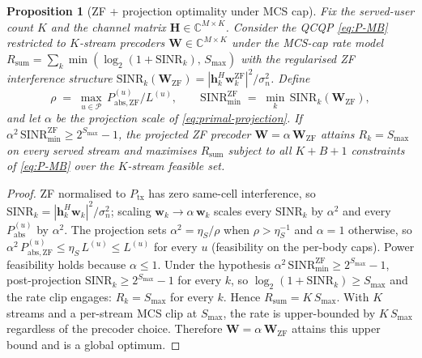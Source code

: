 \documentclass[journal,twocolumn,10pt]{IEEEtran}
\theoremstyle{plain}
\newtheorem{proposition}[theorem]{Proposition}
\theoremstyle{remark}
\newcommand{\hh}{\mathbf{h}}
\newcommand{\ww}{\mathbf{w}}
\newcommand{\Pabs}{P_{\mathrm{abs}}}
\newcommand{\HH}{\mathbf{H}}
\newcommand{\WW}{\mathbf{W}}
\newcommand{\PabsZF}{P_{\mathrm{abs},\mathrm{ZF}}}
\newcommand{\Complex}{\mathbb{C}}
\newcommand{\AllBodies}{\mathcal{P}}
\begin{document}
\begin{proposition}[ZF + projection optimality under MCS cap]
\label{prop:projection-optimality}
Fix the served-user count $K$ and the channel matrix
$\HH \in \Complex^{M \times K}$. Consider the QCQP
\cref{eq:P-MB} restricted to $K$-stream precoders
$\WW \in \Complex^{M\times K}$ under the MCS-cap rate model
$R_{\mathrm{sum}} = \sum_k \min(\log_2(1 + \mathrm{SINR}_k),\,
S_{\max})$ with the regularised ZF interference structure
$\mathrm{SINR}_k(\WW_{\mathrm{ZF}}) = |\hh_k^H \ww_k^{\mathrm{ZF}}|^2/
\sigma_n^2$. Define
\[
\rho \;=\; \max_{u \in \AllBodies}\,
        \PabsZF^{(u)}/L^{(u)},
\qquad
\mathrm{SINR}^{\mathrm{ZF}}_{\min}
\;=\; \min_k\,\mathrm{SINR}_k(\WW_{\mathrm{ZF}}),
\]
and let $\alpha$ be the projection scale of
\cref{eq:primal-projection}. If
$\alpha^2\,\mathrm{SINR}^{\mathrm{ZF}}_{\min} \geq 2^{S_{\max}} - 1$,
the projected ZF precoder $\WW = \alpha\,\WW_{\mathrm{ZF}}$ attains
$R_k = S_{\max}$ on every served stream and maximises
$R_{\mathrm{sum}}$ subject to all $K + B + 1$ constraints of
\cref{eq:P-MB} over the $K$-stream feasible set.
\end{proposition}

\begin{proof}
ZF normalised to $P_{\mathrm{tx}}$ has zero same-cell interference,
so $\mathrm{SINR}_k = |\hh_k^H \ww_k|^2/\sigma_n^2$; scaling $\ww_k
\to \alpha\,\ww_k$ scales every $\mathrm{SINR}_k$ by $\alpha^2$ and
every $\Pabs^{(u)}$ by $\alpha^2$. The projection sets $\alpha^2 =
\eta_S/\rho$ when $\rho > \eta_S^{-1}$ and $\alpha = 1$ otherwise,
so $\alpha^2\,\PabsZF^{(u)} \leq \eta_S\,L^{(u)} \leq
L^{(u)}$ for every $u$ (feasibility on the per-body caps).
Power feasibility holds because $\alpha \leq 1$.
Under the hypothesis $\alpha^2\,\mathrm{SINR}^{\mathrm{ZF}}_{\min}
\geq 2^{S_{\max}} - 1$, post-projection $\mathrm{SINR}_k \geq
2^{S_{\max}} - 1$ for every $k$, so $\log_2(1 + \mathrm{SINR}_k)
\geq S_{\max}$ and the rate clip engages: $R_k = S_{\max}$ for
every $k$. Hence $R_{\mathrm{sum}} = K\,S_{\max}$. With $K$ streams
and a per-stream MCS clip at $S_{\max}$, the rate is upper-bounded
by $K\,S_{\max}$ regardless of the precoder choice. Therefore
$\WW = \alpha\,\WW_{\mathrm{ZF}}$ attains this upper bound and is a global
optimum.
\end{proof}
\end{document}
